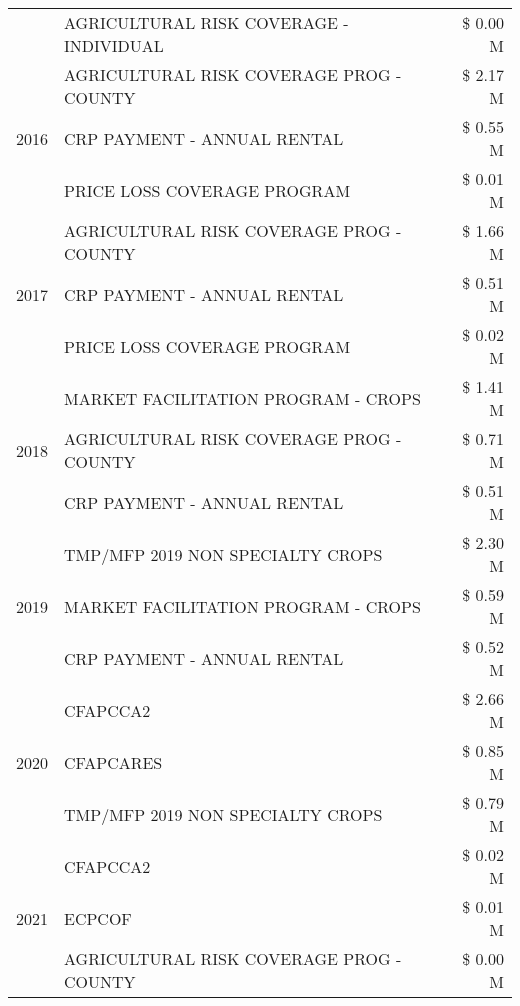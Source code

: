 \begin{tabular}{llr}
 & AGRICULTURAL RISK COVERAGE - INDIVIDUAL & \$ 0.00 M \\
\cline{1-3}
\multirow[t]{3}{*}{2016} & AGRICULTURAL RISK COVERAGE PROG - COUNTY & \$ 2.17 M \\
 & CRP PAYMENT - ANNUAL RENTAL & \$ 0.55 M \\
 & PRICE LOSS COVERAGE PROGRAM & \$ 0.01 M \\
\cline{1-3}
\multirow[t]{3}{*}{2017} & AGRICULTURAL RISK COVERAGE PROG - COUNTY & \$ 1.66 M \\
 & CRP PAYMENT - ANNUAL RENTAL & \$ 0.51 M \\
 & PRICE LOSS COVERAGE PROGRAM & \$ 0.02 M \\
\cline{1-3}
\multirow[t]{3}{*}{2018} & MARKET FACILITATION PROGRAM - CROPS & \$ 1.41 M \\
 & AGRICULTURAL RISK COVERAGE PROG - COUNTY & \$ 0.71 M \\
 & CRP PAYMENT - ANNUAL RENTAL & \$ 0.51 M \\
\cline{1-3}
\multirow[t]{3}{*}{2019} & TMP/MFP 2019 NON SPECIALTY CROPS & \$ 2.30 M \\
 & MARKET FACILITATION PROGRAM - CROPS & \$ 0.59 M \\
 & CRP PAYMENT - ANNUAL RENTAL & \$ 0.52 M \\
\cline{1-3}
\multirow[t]{3}{*}{2020} & CFAPCCA2 & \$ 2.66 M \\
 & CFAPCARES & \$ 0.85 M \\
 & TMP/MFP 2019 NON SPECIALTY CROPS & \$ 0.79 M \\
\cline{1-3}
\multirow[t]{3}{*}{2021} & CFAPCCA2 & \$ 0.02 M \\
 & ECPCOF & \$ 0.01 M \\
 & AGRICULTURAL RISK COVERAGE PROG - COUNTY & \$ 0.00 M \\
\cline{1-3}
\bottomrule
\end{tabular}
